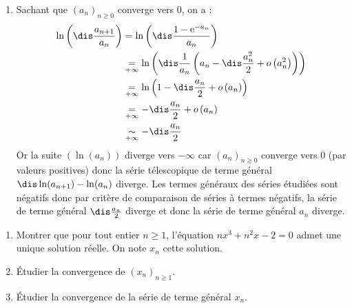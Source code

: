 \documentclass[a4paper,10pt]{report}
\begin{document}
\begin{enumerate}
\item  Sachant que $(a_n)_{n \geq 0}$ converge vers $0$, on a :
\begin{align*}
\ln \left( {\dis\frac{{a_{n + 1} }}{{a_n }}} \right) & =  \ln \left( {\dis\frac{1 - {\mathrm{e}}^{ - a_n }}{{a_n }}} \right) \\
&  \underset{+ \infty}{=}  \ln \left( \dis\frac{1}{a_n}\left(a_n-\dis\frac{a_n^2}{2}+ o\left(a_n^2\right)\right) \right)\\
& \underset{+ \infty}{=}  	\ln \left(1-\dis\frac{a_n}{2}+ o\left(a_n\right) \right) \\
& \underset{+ \infty}{=} -\dis\frac{a_n}{2}+ o\left(a_n\right) \\
& \underset{+ \infty}{\sim} -\dis\frac{a_n}{2} \\
\end{align*}
Or la suite $(\ln(a_n))$ diverge vers $-\infty$ car $(a_n)_{n \geq 0}$ converge vers $0$ (par valeurs positives) donc la s\'erie t\'elescopique de terme général $\dis \ln(a_{n+1})-\ln(a_n)$ diverge. Les termes g\'en\'eraux des s\'eries étudiées sont n\'egatifs donc par critère de comparaison de séries à termes négatifs, la série de terme général $ \dis\frac{a_n}{2}$ diverge et donc la s\'erie de terme général $a_n$ diverge.
\end{enumerate}

\medskip


\begin{Exercice}{} 
\begin{enumerate}
\item Montrer que pour tout entier $n \geq 1$, l'équation $nx^3+n^2x-2=0$ admet une unique solution réelle. On note $x_n$ cette solution.
\item Étudier la convergence de $(x_n)_{n \geq 1}$.
\item Étudier la convergence de la série de terme général $x_n$.
\end{enumerate}
\end{Exercice}

\corr 
\end{document}
